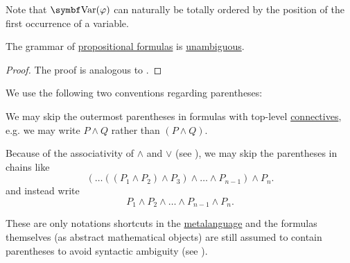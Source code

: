 \begin{definition}
\begin{DefEnum}
    Note that \( \Bold{Var}(\varphi) \) can naturally be totally ordered by the position of the first occurrence of a variable.
  \end{DefEnum}
\end{definition}

\begin{proposition}\label{thm:propositional_formulas_are_unambiguous}
  The grammar of \hyperref[def:propositional_language/formula]{propositional formulas} is \hyperref[def:grammar_derivation/ambiguity]{unambiguous}.
\end{proposition}
\begin{proof}
  The proof is analogous to .
\end{proof}

\begin{remark}\label{rem:propositional_formula_parentheses}
  We use the following two conventions regarding parentheses:
  \begin{RemEnum}
     We may skip the outermost parentheses in formulas with top-level \hyperref[def:propositional_alphabet/connectives]{connectives}, e.g. we may write \( P \wedge Q \) rather than \( (P \wedge Q) \).

     Because of the associativity of \( \wedge \) and \( \vee \) (see ), we may skip the parentheses in chains like
    \begin{equation*}
      ( \ldots ((P_1 \wedge P_2) \wedge P_3) \wedge \ldots \wedge P_{n-1} ) \wedge P_n.
    \end{equation*}
    and instead write
    \begin{equation*}
      P_1 \wedge P_2 \wedge \ldots \wedge P_{n-1} \wedge P_n.
    \end{equation*}
  \end{RemEnum}

  These are only notations shortcuts in the \hyperref[rem:metalanguage_syntax_and_semantics]{metalanguage} and the formulas themselves (as abstract mathematical objects) are still assumed to contain parentheses to avoid syntactic ambiguity (see ).
\end{remark}

